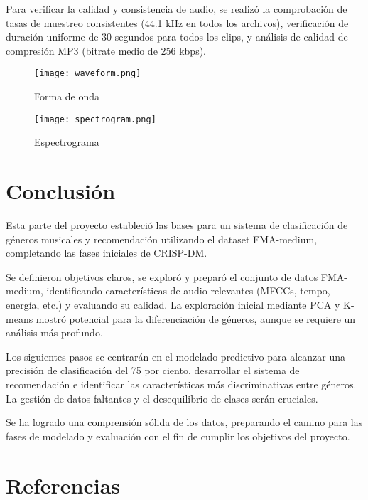 \documentclass{article}
\begin{document}
Para verificar la calidad y consistencia de audio, se realizó la comprobación de tasas de muestreo consistentes (44.1 kHz en todos los archivos), verificación de duración uniforme de 30 segundos para todos los clips, y análisis de calidad de compresión MP3 (bitrate medio de 256 kbps).

\begin{figure}[H]
    \centering
    \texttt{[image: waveform.png]}
    \caption{Forma de onda}
    \label{fig:enter-label}
\end{figure}

\begin{figure}[H]
    \centering
    \texttt{[image: spectrogram.png]}
    \caption{Espectrograma}
    \label{fig:enter-label}
\end{figure}

\section*{Conclusión}

Esta parte del proyecto estableció las bases para un sistema de clasificación de géneros musicales y recomendación utilizando el dataset FMA-medium, completando las fases iniciales de CRISP-DM. 

Se definieron objetivos claros, se exploró y preparó el conjunto de datos FMA-medium, identificando características de audio relevantes (MFCCs, tempo, energía, etc.) y evaluando su calidad. La exploración inicial mediante PCA y K-means mostró potencial para la diferenciación de géneros, aunque se requiere un análisis más profundo.

Los siguientes pasos se centrarán en el modelado predictivo para alcanzar una precisión de clasificación del 75 por ciento, desarrollar el sistema de recomendación e identificar las características más discriminativas entre géneros. La gestión de datos faltantes y el desequilibrio de clases serán cruciales.

Se ha logrado una comprensión sólida de los datos, preparando el camino para las fases de modelado y evaluación con el fin de cumplir los objetivos del proyecto.

\section*{Referencias}
\end{document}
